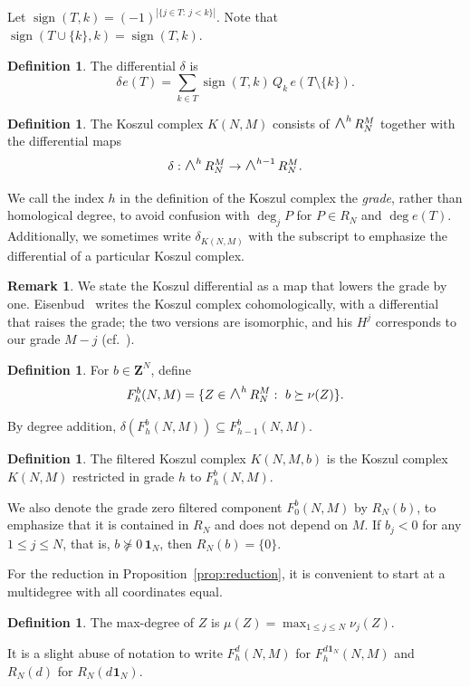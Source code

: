 \documentclass[12pt]{amsart}
\theoremstyle{definition}
\newtheorem{definition1}[theorem]{Definition}
\newtheorem{remark1}[theorem]{Remark}
\theoremstyle{remark}
\newcommand{\sgn}{\operatorname{sign}}
\newcommand{\Z}{\mathbf Z}
\newcommand{\One}{\mathbf{1}}
\newcommand{\dOne}[1]{d\mspace{1mu}\One_{#1}}
\newcommand{\WedgeAux}[2]{\scalebox{1.35}{$#1\wedge$}}
\newcommand{\Wedge}{\mathop{\mathpalette\WedgeAux\relax}\nolimits}
\begin{document}
Let $\sgn(T,k)=(-1)^{|\{j\in T:\ j<k\}|}$. Note that $\sgn(T\cup\{k\},k)=\sgn(T,k)$.
\begin{definition1} The differential $\delta$ is
\[
\delta\mspace{1mu} e(T)=\sum_{k\in T}\sgn(T,k)\,Q_k\,e(T\setminus \{k\}).
\]
\end{definition1}
\begin{definition1}
  The Koszul complex
  $K(N, M)$ consists of $\Wedge^h R_N^M$
  together with the differential maps
  \[
  \delta:\Wedge^h R_N^M \rightarrow
  \Wedge^{h-1} R_N^M.
  \]
\end{definition1}
We call the index $h$ in the definition of the Koszul
complex the \emph{grade},
rather than homological degree,
to avoid confusion with $\deg_j P$ for $P\in R_N$ and $\deg e(T)$.
Additionally, we sometimes write $\delta_{K(N, M)}$ with the subscript to emphasize
the differential of a particular Koszul complex. 
\begin{remark1}
We state the Koszul differential as a map that lowers the grade by one.
Eisenbud~\cite[\S17.2]{Eisenbud1995} writes the Koszul complex cohomologically,
with a differential that raises the grade; the two versions are isomorphic, and
his $H^j$ corresponds to our grade $M-j$ (cf.\ \cite[Ex.~4.5.2]{Weibel}).
\end{remark1}

\begin{definition1}
 For $b\in \Z^N$, define
\[
F^b_h(N, M) =\{Z\in \Wedge^h R_N^M:\ b \succeq \nu(Z) \}.
\]
\end{definition1}
By degree addition, $\delta(F^b_h(N, M))\subseteq F^b_{h-1}(N, M)$. 
\begin{definition1}
  The filtered Koszul complex $K(N, M, b)$ is the Koszul complex $K(N,M)$
restricted in grade $h$ to $F^b_h(N, M)$.
\end{definition1}
We also denote the grade zero filtered component $F^b_0(N, M)$ by $R_N(b)$,
to emphasize that it is contained in $R_N$ and does not depend on $M$.  If $b_j < 0$
for any $1 \leq j \leq N$, that is, $b \not\succeq 0\, \One_N$,
then $R_N(b) = \{ 0 \}$.

For the reduction in Proposition~\ref{prop:reduction},
it is convenient to start at a multidegree with all coordinates equal.
\begin{definition1}
  The max-degree of $Z$ is $\mu(Z) = \max_{1\leq j \leq N} \nu_j(Z)$.
\end{definition1}
It is a slight abuse of notation to write $F^d_h(N, M)$ for $F^{\dOne{N}}_h(N, M)$
and $R_N(d)$ for $R_N(\dOne{N})$. 
\end{document}
